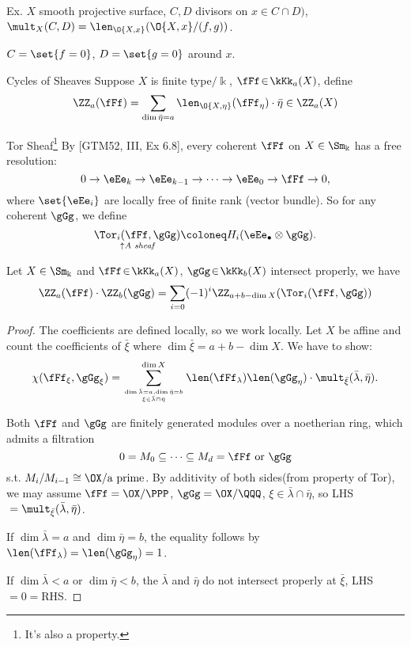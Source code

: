 Ex. $X$ smooth projective surface, $C, D$ divisors on $x\in C \cap D)$, $\mult_X(C,
D)=\len_{\O{X,x}}(\O{X,x} /(f, g))$.

$C=\set{f=0}$, $D=\set{g=0}$ around $x$.

\begin{definition}{Cycles of Sheaves}{}
	Suppose $X$ is finite type$/\Bbbk$, $\fFf\!\in\!\kKk_a(X)$, define
	\[
			\ZZ_a(\fFf)=\sum_{\dim\bar{\eta}=a}\len_{\O{X,\eta}}(\fFf_{\eta})\cdot{\bar{\eta}}\in\ZZ_a(X)
	\]
\end{definition}

\begin{definition}{Tor Sheaf\footnote{It's also a property.}}{}
	By [GTM52, III, Ex 6.8], every coherent $\fFf$ on $X \in \Sm_{\Bbbk}$ has a free resolution:
	$$
	0 \to \eEe_k \rightarrow \eEe_{k-1}\to \cdots \to \eEe_0 \rightarrow \fFf \rightarrow 0,
	$$
	where $\set{\eEe_i}$ are locally free of finite rank (vector bundle). So for any coherent $\gGg$, we define
	$$
	\underset{\uparrow\emph{A sheaf}}{\Tor_i(\fFf, \gGg)}\coloneq H_i(\eEe_{\bullet} \otimes \gGg).
	$$
\end{definition}

\begin{proposition}{}{}
	Let $X\in \Sm_{\Bbbk}$ and $\fFf\!\in\!\kKk_a(X)$, $\gGg\!\in\!\kKk_b(X)$ intersect properly, we have
	\[
			\ZZ_a(\fFf)\cdot \ZZ_b(\gGg)=\sum_{i=0}(-1)^i\ZZ_{a+b-\dim X}(\Tor_i(\fFf,\gGg))
	\]
\end{proposition}
\begin{proof}
	The coefficients are defined locally, so we work locally. Let $X$ be affine and count the coefficients of $\bar{\xi}$ where $\dim\bar{\xi}=a+b-\dim X$. We have to show:
	\[
			\chi(\fFf_{\xi},\gGg_{\xi})
			=\sum_{{\dim\bar{\lambda}=a,\dim\bar{\eta}=b}\atop{\xi\in\bar{\lambda}\cap\bar{\eta}}}^{\dim X}
			\len(\fFf_{\lambda})\len(\gGg_{\eta})\cdot \mult_{\bar{\xi}}(\bar{\lambda},\bar{\eta}).
	\]

	Both $\fFf$ and $\gGg$ are finitely generated modules over a noetherian ring, which
	admits a filtration
	\[
			0=M_0\subseteq\cdots\subseteq M_d=\fFf\text{ or }\gGg
	\]
	s.t. $M_i/M_{i-1}\cong\OX/\text{a prime}$. By additivity of both sides(from property of
	Tor), we may assume $\fFf=\OX/\PPP$, $\gGg=\OX/\QQQ$,
	$\xi\in\bar{\lambda}\cap\bar{\eta}$, so LHS${}=\mult_{\bar{\xi}}(\bar{\lambda},
	\bar{\eta})$.

	If $\dim \bar{\lambda}=a$ and $\dim \bar{\eta}=b$, the equality follows by
	$\len(\fFf_\lambda)=\len(\gGg_\eta)=1$.

	If $\dim \bar{\lambda}<a$ or $\dim \bar{\eta}<b$, the $\bar{\lambda}$ and $\bar{\eta}$ do
	not intersect properly at $\bar{\xi}$, LHS${}=0={}$RHS.

\end{proof}

